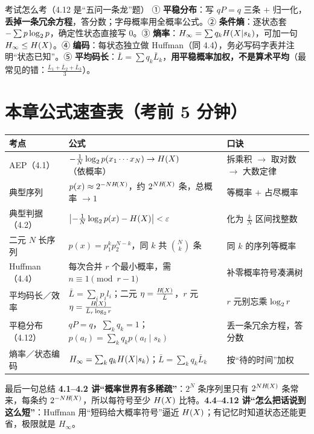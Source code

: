 \documentclass[11pt,a4paper]{ctexart}
\begin{document}
\begin{exam}{考试怎么考（4.12 是“五问一条龙”题）}
① \textbf{平稳分布}：写 $qP=q$ 三条 $+$ 归一化，\textbf{丢掉一条冗余方程}，答分数；字母概率用全概率公式。② \textbf{条件熵}：逐状态套 $-\sum p\log_{2} p$，确定性状态直接写 $0$。③ \textbf{熵率}：$H_\infty=\sum q_kH\!\left(X|s_k\right)$，可加一句 $H_\infty\le H\!\left(X\right)$。④ \textbf{编码}：每状态独立做 Huffman（同 4.4），务必写码字表并注明“状态已知”。⑤ \textbf{平均码长}：$\bar L=\sum q_k\bar L_k$，\textbf{用平稳概率加权，不是算术平均}（最常见的错：$\frac{\bar L_1+\bar L_2+\bar L_3}{3}$）。
\end{exam}

\section*{本章公式速查表（考前 5 分钟）}
\begin{center}
\small
\begin{tabular}{@{}p{} p{} p{}@{}}
\toprule
\textbf{考点} & \textbf{公式} & \textbf{口诀}\\
\midrule
AEP（4.1） & $-\frac1N\log_{2} p(x_1\cdots x_N)\to H\!\left(X\right)$（依概率） & 拆乘积 $\to$ 取对数 $\to$ 大数定律\\
典型序列 & $p(x)\approx2^{-NH\!\left(X\right)}$，约 $2^{NH\!\left(X\right)}$ 条，总概率 $\to1$ & 等概率 $+$ 占尽概率\\
典型判据（4.2） & $\bigl|-\frac1N\log_{2}p\!\left(x\right)-H\!\left(X\right)\bigr|<\varepsilon$ & 化为 $\frac kN$ 区间找整数\\
二元 $N$ 长序列 & $p(x)=p_1^kp_2^{N-k}$，同 $k$ 共 $\binom Nk$ 条 & 同 $k$ 的序列等概率\\
Huffman（4.4） & 每次合并 $r$ 个最小概率，需 $n\equiv1\!\!\pmod{r-1}$ & 补零概率符号凑满树\\
平均码长／效率 & $\bar L=\sum_ip_il_i$；二元 $\eta=\frac{H\!\left(X\right)}{\bar L}$，$r$ 元 $\eta=\frac{H\!\left(X\right)}{\bar L_r\log_{2} r}$ & $r$ 元别忘乘 $\log_{2} r$\\
平稳分布（4.12） & $qP=q$，$\sum_kq_k=1$；$p(a_l)=\sum_kq_kp(a_l\mid s_k)$ & 丢一条冗余方程，答分数\\
熵率／状态编码 & $H_\infty=\sum_kq_kH\!\left(X|s_k\right)$；$\bar L=\sum_kq_k\bar L_k$ & 按“待的时间”加权\\
\bottomrule
\end{tabular}
\end{center}

\begin{idea}{最后一句总结}
\textbf{4.1--4.2 讲“概率世界有多稀疏”}：$2^N$ 条序列里只有 $2^{NH\!\left(X\right)}$ 条常来，每条约 $2^{-NH\!\left(X\right)}$，所以每符号至少 $H\!\left(X\right)$ 比特。\textbf{4.4--4.12 讲“怎么把话说到这么短”}：Huffman 用“短码给大概率符号”逼近 $H\!\left(X\right)$；有记忆时知道状态还能更省，极限就是 $H_\infty$。
\end{idea}
\end{document}
